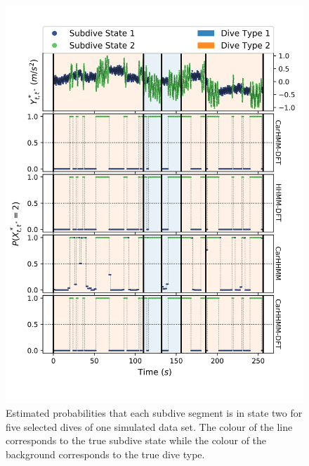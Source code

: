 \begin{figure}[ht]
    \centering
    \includegraphics[width=4.5in]{../Plots/Posterior_Fine_States.png}
    \caption{Estimated probabilities that each subdive segment is in state two for five selected dives of one simulated data set. The colour of the line corresponds to the true subdive state while the colour of the background corresponds to the true dive type.}
    \label{fig:acc_fine}
\end{figure}